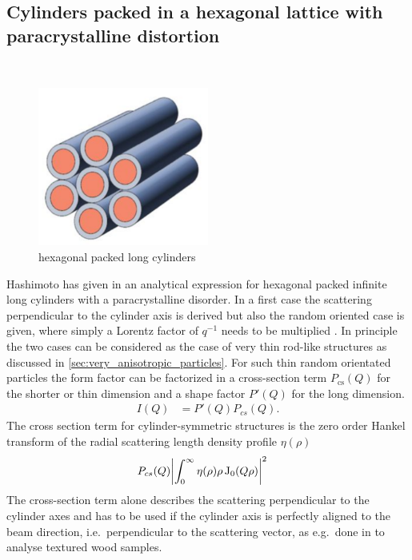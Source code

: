 \subsection{Cylinders packed in a hexagonal lattice with paracrystalline distortion}
\label{sect:CylHex_paracrystalline}
\hspace{1pt}\\
\begin{figure}[htb]
\begin{center}
\includegraphics[width=0.5\textwidth]{../images/form_factor/cylindrical_obj/HEXcyl.pdf}
\end{center}
\caption{hexagonal packed long cylinders}
\label{fig:hex_long_cylinder}
\end{figure}
Hashimoto has given in \cite{Hashimoto1994} an analytical expression for hexagonal packed infinite long cylinders with a paracrystalline disorder. In a first case the scattering perpendicular to the cylinder axis is derived but also the random oriented case is given, where simply a Lorentz factor of $q^{-1}$ needs to be multiplied \cite{Shibayama1989,Glatter1982}.
In principle the two cases can be considered as the case of very thin rod-like structures as discussed in \ref{sec:very_anisotropic_particles}. For such thin random orientated particles the form factor can be factorized  in a cross-section term $P_\text{cs}(Q)$ for the shorter or thin dimension and a shape factor $P'(Q)$ for the long dimension.
\begin{align}
\label{eq:PprimePcs}
I(Q) &=P'(Q) P_{cs}(Q).
\end{align}
The cross section term for cylinder-symmetric structures is the zero order Hankel transform of the radial scattering length density profile $\eta(\rho)$
\begin{align}\label{eq:PcsHankel}
  P_{cs}(Q) & \abs{\int_0^\infty \eta(\rho) \rho\operatorname{J}_0(Q\rho)}^2
\end{align}
The cross-section term alone describes the scattering perpendicular to the cylinder axes and has to be used if the cylinder axis is perfectly aligned to the beam direction, i.e.\ perpendicular to the scattering vector, as e.g.\ done in \cite{Penttilae2019} to analyse textured wood samples.
